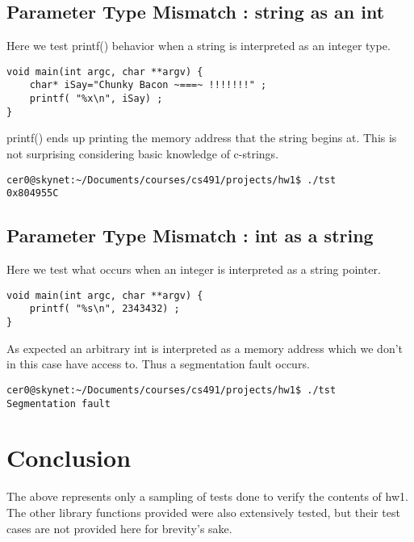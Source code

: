 \documentclass[onecolumn]{article}
\begin{document}
\subsection{ Parameter Type Mismatch : string as an int }
Here we test printf() behavior when a string is interpreted
as an integer type.
\begin{verbatim}
void main(int argc, char **argv) {
	char* iSay="Chunky Bacon ~===~ !!!!!!!" ;
	printf( "%x\n", iSay) ;
}
\end{verbatim}


printf() ends up printing the memory address that the 
string begins at. This is not surprising considering
basic knowledge of c-strings.
\begin{verbatim}
cer0@skynet:~/Documents/courses/cs491/projects/hw1$ ./tst
0x804955C
\end{verbatim}
\subsection{ Parameter Type Mismatch : int as a string }
Here we test what occurs when an integer is interpreted
as a string pointer.
\begin{verbatim}
void main(int argc, char **argv) {
	printf( "%s\n", 2343432) ;
}
\end{verbatim}


As expected an arbitrary int is interpreted as a memory
address which we don't in this case have access to. Thus
a segmentation fault occurs.
\begin{verbatim}
cer0@skynet:~/Documents/courses/cs491/projects/hw1$ ./tst
Segmentation fault
\end{verbatim}
\section{Conclusion}
The above represents only a sampling of tests done to verify 
the contents of hw1. The other library functions provided
were also extensively tested, but their test cases are not
provided here for brevity's sake.
\end{document}
